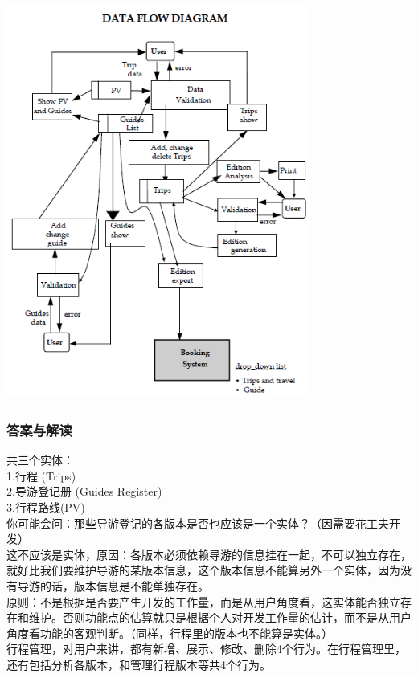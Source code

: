 \includegraphics[width=10cm]{Sifp32.png}

\hypertarget{ux63a5ux4e58ux5ba2}{%
\subsubsection{答案与解读}\label{ux63a5ux4e58ux5ba2}}

共三个实体：\\

1.行程 (Trips)\\
2.导游登记册 (Guides Register)\\
3.行程路线(PV)\\

你可能会问：那些导游登记的各版本是否也应该是一个实体？（因需要花工夫开发）\\
这不应该是实体，原因：各版本必须依赖导游的信息挂在一起，不可以独立存在，就好比我们要维护导游的某版本信息，这个版本信息不能算另外一个实体，因为没有导游的话，版本信息是不能单独存在。\\


原则：不是根据是否要产生开发的工作量，而是从用户角度看，这实体能否独立存在和维护。否则功能点的估算就只是根据个人对开发工作量的估计，而不是从用户角度看功能的客观判断。（同样，行程里的版本也不能算是实体。）\\

行程管理，对用户来讲，都有新增、展示、修改、删除4个行为。在行程管理里，还有包括分析各版本，和管理行程版本等共4个行为。\\

